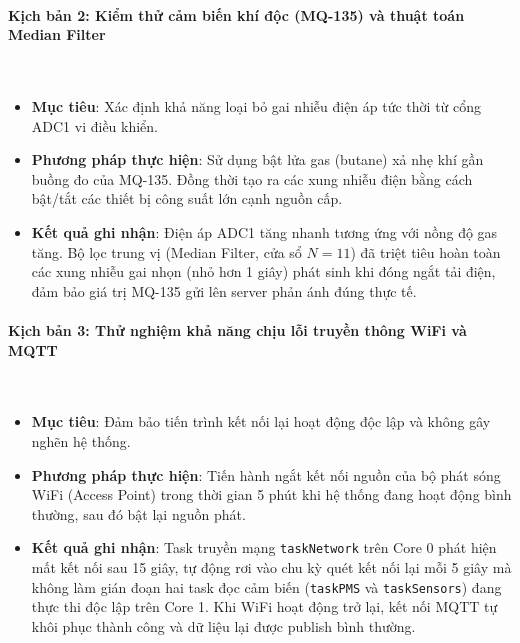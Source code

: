 \documentclass[12pt,a4paper]{article}
\begin{document}
\paragraph{Kịch bản 2: Kiểm thử cảm biến khí độc (MQ-135) và thuật toán Median Filter}\mbox{}\\
\begin{itemize}
    \item \textbf{Mục tiêu}: Xác định khả năng loại bỏ gai nhiễu điện áp tức thời từ cổng ADC1 vi điều khiển.
    \item \textbf{Phương pháp thực hiện}: Sử dụng bật lửa gas (butane) xả nhẹ khí gần buồng đo của MQ-135. Đồng thời tạo ra các xung nhiễu điện bằng cách bật/tắt các thiết bị công suất lớn cạnh nguồn cấp.
    \item \textbf{Kết quả ghi nhận}: Điện áp ADC1 tăng nhanh tương ứng với nồng độ gas tăng. Bộ lọc trung vị (Median Filter, cửa sổ $N=11$) đã triệt tiêu hoàn toàn các xung nhiễu gai nhọn (nhỏ hơn 1 giây) phát sinh khi đóng ngắt tải điện, đảm bảo giá trị MQ-135 gửi lên server phản ánh đúng thực tế.
\end{itemize}

\paragraph{Kịch bản 3: Thử nghiệm khả năng chịu lỗi truyền thông WiFi và MQTT}\mbox{}\\
\begin{itemize}
    \item \textbf{Mục tiêu}: Đảm bảo tiến trình kết nối lại hoạt động độc lập và không gây nghẽn hệ thống.
    \item \textbf{Phương pháp thực hiện}: Tiến hành ngắt kết nối nguồn của bộ phát sóng WiFi (Access Point) trong thời gian 5 phút khi hệ thống đang hoạt động bình thường, sau đó bật lại nguồn phát.
    \item \textbf{Kết quả ghi nhận}: Task truyền mạng \texttt{taskNetwork} trên Core 0 phát hiện mất kết nối sau 15 giây, tự động rơi vào chu kỳ quét kết nối lại mỗi 5 giây mà không làm gián đoạn hai task đọc cảm biến (\texttt{taskPMS} và \texttt{taskSensors}) đang thực thi độc lập trên Core 1. Khi WiFi hoạt động trở lại, kết nối MQTT tự khôi phục thành công và dữ liệu lại được publish bình thường.
\end{itemize}
\end{document}
